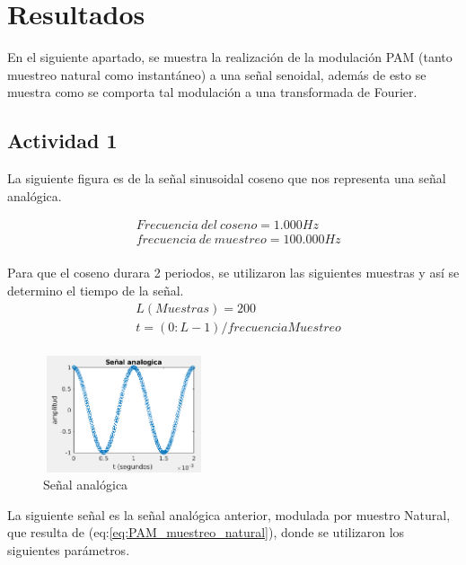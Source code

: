 \section{Resultados}\label{sec:resultados}

En el siguiente apartado, se muestra la realización de la modulación PAM (tanto muestreo natural como instantáneo) a una señal senoidal, además de esto se muestra como se comporta tal modulación a una transformada de Fourier.


\subsection{Actividad 1}
La siguiente figura es de la señal sinusoidal coseno que nos representa una señal analógica.

\begin{equation} \label{eq:frecuencia_del_coseno_y_muestreo}
\begin{split} 
&Frecuencia\ del\ coseno = 1.000 Hz \\
&frecuencia\ de\ muestreo = 100.000 Hz \\
\end{split} 
\end{equation} 

Para que el coseno durara 2 periodos, se utilizaron las siguientes muestras y así se determino el tiempo de la señal.
\begin{equation} \label{eq:L_Muestras}
\begin{split} 
&L(Muestras) = 200 \\
&t=(0:L-1)/frecuenciaMuestreo \\
\end{split} 
\end{equation} 




\begin{figure}[H]
    \centering
    \includegraphics[height=130px, width=180px]{Imagenes/Actividad1/SA.png}
    \caption{Señal analógica}
    \label{fig:Señal_Analógica}
\end{figure}

La siguiente señal es la señal analógica anterior, modulada por muestro Natural, que resulta de (eq:\ref{eq:PAM_muestreo_natural}), donde se utilizaron los siguientes parámetros.

